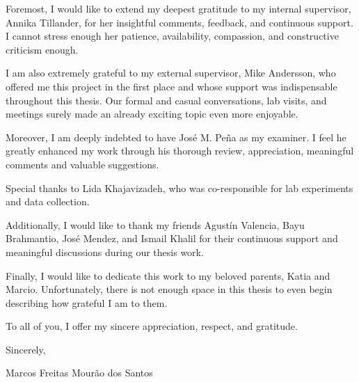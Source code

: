 

Foremost, I would like to extend my deepest gratitude to my internal supervisor, Annika Tillander, for her insightful comments, feedback, and continuous support. I cannot stress enough her patience, availability, compassion, and constructive criticism enough.

I am also extremely grateful to my external supervisor, Mike Andersson, who offered me this project in the first place and whose support was indispensable throughout this thesis. Our formal and casual conversations, lab visits, and meetings surely made an already exciting topic even more enjoyable.

Moreover, I am deeply indebted to have José M. Peña as my examiner. I feel he greatly enhanced my work through his thorough review, appreciation, meaningful comments and valuable suggestions.

Special thanks to Lida Khajavizadeh, who was co-responsible for lab experiments and data collection.

Additionally, I would like to thank my friends Agustín Valencia, Bayu Brahmantio, José Mendez, and Ismail Khalil for their continuous support and meaningful discussions during our thesis work.

Finally, I would like to dedicate this work to my beloved parents, Katia and Marcio. Unfortunately, there is not enough space in this thesis to even begin describing how grateful I am to them.

To all of you, I offer my sincere appreciation, respect, and gratitude.

\null\hfill Sincerely,

\null\hfill Marcos Freitas Mourão dos Santos



